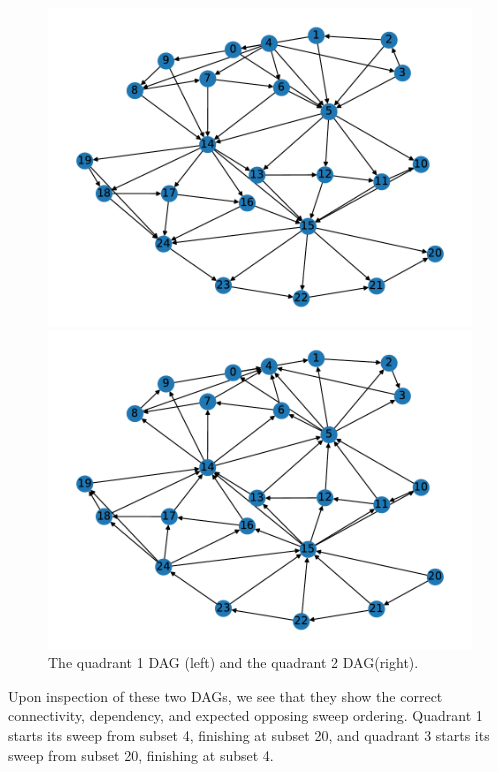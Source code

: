 \begin{figure}[H]
\begin{minipage}[c]{0.5\textwidth}
\includegraphics[scale=0.55]{../../figures/25_graph1.pdf}
\end{minipage}
\begin{minipage}[c]{0.5\textwidth}
\includegraphics[scale=0.55]{../../figures/25_graph2.pdf}
\end{minipage}
\caption{The quadrant 1 DAG (left) and the quadrant 2 DAG(right).}
\label{25_q1q2graphs}
\end{figure}
Upon inspection of these two DAGs, we see that they show the correct connectivity, dependency, and expected opposing sweep ordering. 
Quadrant 1 starts its sweep from subset 4, finishing at subset 20, and quadrant 3 starts its sweep from subset 20, finishing at subset 4.

